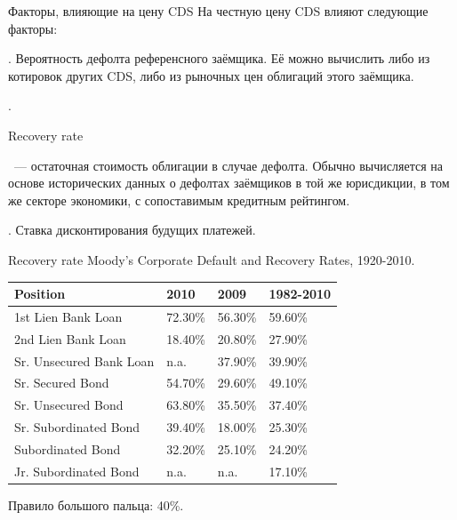\documentclass{beamer}
\newcommand{\en}[1]{\begin{otherlanguage}{english}#1\end{otherlanguage}}
\begin{document}
\begin{frame}{Факторы, влияющие на цену CDS}
\justify
На честную цену CDS влияют следующие факторы:

. Вероятность дефолта референсного заёмщика. Её можно вычислить либо из котировок других CDS, либо из рыночных цен облигаций этого заёмщика.

. \en{Recovery rate}\ --- остаточная стоимость  облигации в случае дефолта. Обычно вычисляется на основе исторических данных о дефолтах заёмщиков в той же юрисдикции, в том же секторе экономики, с сопоставимым кредитным рейтингом.

. Ставка дисконтирования будущих платежей.

\end{frame}



\begin{frame}{Recovery rate}
\justify
Moody's Corporate Default and Recovery Rates, 1920-2010.

\vspace{\baselineskip}
\begin{tabular}{l|l|l|l}
Position						& 2010		& 2009		& 1982-2010 \\
\hline
1st	Lien Bank Loan	 		& 72.30\%	& 56.30\% & 59.60\% \\
2nd Lien Bank Loan 		& 18.40\%	& 20.80\% & 27.90\% \\
Sr. Unsecured	Bank Loan	& n.a.		& 37.90\% & 39.90\% \\
Sr. Secured Bond			& 54.70\%	& 29.60\% & 49.10\%	 \\
\hline
Sr. Unsecured	Bond		& 63.80\%	& 35.50\% & 37.40\%	 \\
\hline
Sr. Subordinated Bond	& 39.40\%	& 18.00\% & 25.30\%	\\
Subordinated Bond		& 32.20\%	& 25.10\% & 24.20\%	\\
Jr. Subordinated Bond	 	& n.a.		& n.a.		&17.10\%	\\
\end{tabular}

\justify
Правило большого пальца: 40\%.
\end{frame}
\end{document}
